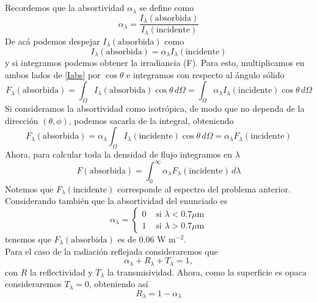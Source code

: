 \documentclass{tarea}
\begin{document}
\subsection{}
Recordemos que la absortividad $\alpha_\lambda$ se define como
\begin{equation}
    \alpha_\lambda = \frac{I_\lambda (\text{absorbida})}{I_\lambda (\text{incidente})} \nonumber
\end{equation}
De acá podemos despejar $I_\lambda (\text{absorbida})$ como
\begin{equation}
    I_\lambda (\text{absorbida}) = \alpha_\lambda I_\lambda (\text{incidente}) \label{Iabs}
\end{equation}
y si integramos podemos obtener la irradiancia (F). Para esto, multiplicamos en ambos lados de \eqref{Iabs} por $\cos\theta$ e integramos con respecto al ángulo sólido
\begin{equation}
    F_\lambda (\text{absorbida}) = \int_\Omega I_\lambda (\text{absorbida}) \cos\theta \, d\Omega = \int_\Omega \alpha_\lambda I_\lambda (\text{incidente}) \cos\theta \, d\Omega \nonumber
\end{equation}
Si consideramos la absortividad como isotrópica, de modo que no dependa de la dirección $(\theta,\phi)$, podemos sacarla de la integral, obteniendo
\begin{equation}
    F_\lambda (\text{absorbida}) = \alpha_\lambda \int_\Omega I_\lambda (\text{incidente}) \cos\theta \, d\Omega  = \alpha_\lambda F_\lambda (\text{incidente}) \nonumber
\end{equation}
Ahora, para calcular toda la densidad de flujo integramos en $\lambda$
 \begin{equation}
    F (\text{absorbida}) = \int_0^{\infty} \alpha_\lambda F_\lambda (\text{incidente}) \, d\lambda \nonumber
\end{equation}
Notemos que $F_\lambda (\text{incidente})$ corresponde al espectro del problema anterior. Considerando también que la absortividad del enunciado es
\begin{equation}
    \alpha_\lambda = \begin{cases}
            0 &\text{ si $\lambda < 0.7\mu$m}\\
            1 &\text{ si $\lambda > 0.7\mu$m}
    \end{cases} \nonumber
\end{equation}
tenemos que $F_\lambda (\text{absorbida})$ es de 0.06 W m$^{-2}$.\\

Para el caso de la radiación reflejada consideraremos que
\begin{equation}
    \alpha_\lambda + R_\lambda + T_\lambda = 1, \label{conservI}
\end{equation}
con $R$ la reflectividad y $T_\lambda$ la transmisividad. Ahora, como la superficie es opaca consideraremos $T_\lambda=0$, obteniendo así
$$R_\lambda = 1 - \alpha_\lambda$$
\end{document}
